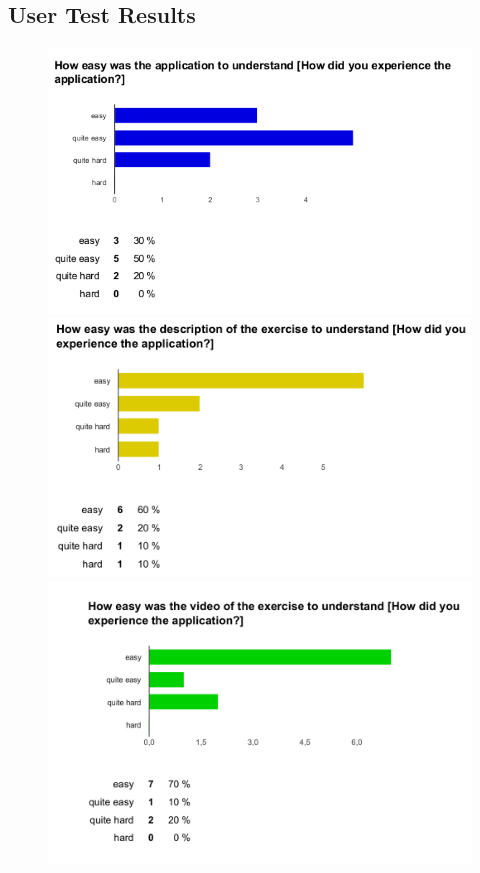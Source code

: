 \subsection{User Test Results}

\begin{figure}[b!]
  \centering
    \begin{minipage}{0.3\textwidth}
      \centering
        \includegraphics[width=1\textwidth]{00_resources/figures/survey_results1.png}
    \end{minipage}
    \begin{minipage}{0.3\textwidth}
      \centering
        \includegraphics[width=1\textwidth]{00_resources/figures/survey_results2.png}
    \end{minipage}
    \begin{minipage}{0.3\textwidth}
      \centering
        \includegraphics[width=1\textwidth]{00_resources/figures/survey_results3.png}

\end{minipage}
\end{figure}
